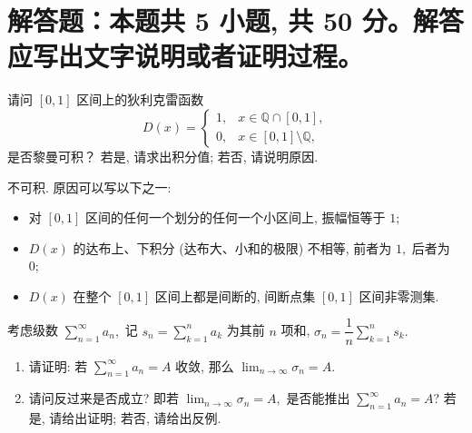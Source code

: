 \section{解答题：本题共 5 小题, 共 50 分。解答应写出文字说明或者证明过程。}


\begin{question}[points = 8]
请问 $[0, 1]$ 区间上的狄利克雷函数
\begin{equation*}
D(x) = \begin{cases} 1, & x \in \mathbb{Q} \cap [0, 1], \\ 0, & x \in [0, 1] \setminus \mathbb{Q}, \end{cases}
\end{equation*}
是否黎曼可积？ 若是, 请求出积分值; 若否, 请说明原因.

\end{question}

\begin{solution}
不可积. 原因可以写以下之一:
\begin{itemize}
\item[\ding{43}] 对 $[0, 1]$ 区间的任何一个划分的任何一个小区间上, 振幅恒等于 $1;$
\item[\ding{43}] $D(x)$ 的达布上、下积分 (达布大、小和的极限) 不相等, 前者为 $1,$ 后者为 $0;$
\item[\ding{43}] $D(x)$ 在整个 $[0, 1]$ 区间上都是间断的, 间断点集 $[0, 1]$ 区间非零测集.
\end{itemize}
\end{solution}

\begin{question}[points = 10]
考虑级数 $\displaystyle \sum_{n=1}^{\infty} a_n,$ 记 $\displaystyle s_n = \sum_{k=1}^{n} a_k$ 为其前 $n$ 项和, $\displaystyle \sigma_n = \dfrac{1}{n} \sum_{k=1}^{n} s_k.$
\begin{enumerate}
\item 请证明: 若 $\displaystyle \sum_{n=1}^{\infty} a_n = A$ 收敛, 那么 $\displaystyle \lim_{n\to\infty} \sigma_n = A.$
\item 请问反过来是否成立? 即若 $\displaystyle \lim_{n\to\infty} \sigma_n = A,$ 是否能推出 $\displaystyle \sum_{n=1}^{\infty} a_n = A$? 若是, 请给出证明; 若否, 请给出反例.
\end{enumerate}

\end{question}

